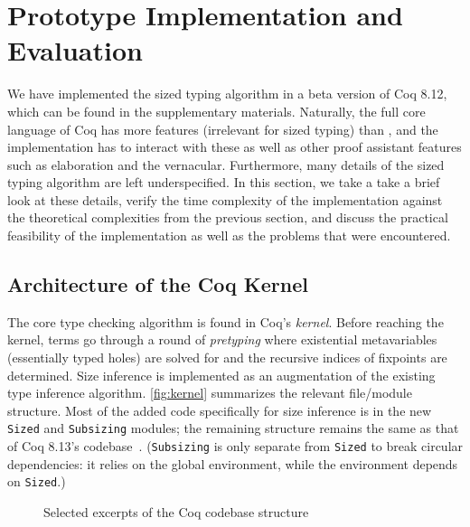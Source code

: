 \section{Prototype Implementation and Evaluation} \label{sec:impl}

We have implemented the sized typing algorithm in a beta version of Coq 8.12,
which can be found in the supplementary materials.
Naturally, the full core language of Coq has more features (irrelevant for sized typing) than \lang,
and the implementation has to interact with these as well as other proof assistant features such as elaboration and the vernacular.
Furthermore, many details of the sized typing algorithm are left underspecified.
In this section, we take a take a brief look at these details,
verify the time complexity of the implementation against the theoretical complexities from the previous section,
and discuss the practical feasibility of the implementation as well as the problems that were encountered.

\subsection{Architecture of the Coq Kernel}

The core type checking algorithm is found in Coq's \emph{kernel}.
Before reaching the kernel, terms go through a round of \emph{pretyping}
where existential metavariables (essentially typed holes) are solved for
and the recursive indices of fixpoints are determined.
Size inference is implemented as an augmentation of the existing type inference algorithm.
\autoref{fig:kernel} summarizes the relevant file/module structure.
Most of the added code specifically for size inference is in the new \texttt{Sized} and \texttt{Subsizing} modules;
the remaining structure remains the same as that of Coq 8.13's codebase~\citep{coq}.
(\texttt{Subsizing} is only separate from \texttt{Sized} to break circular dependencies: it relies on the global environment, while the environment depends on \texttt{Sized}.)

\begin{figure}
\caption{Selected excerpts of the Coq codebase structure}
\label{fig:kernel}
\end{figure}

